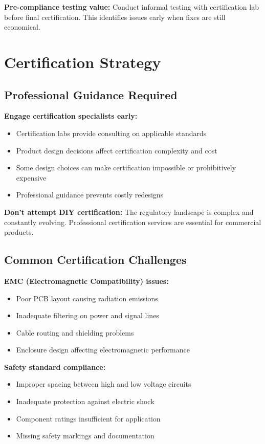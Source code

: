 \textbf{Pre-compliance testing value:}
Conduct informal testing with certification lab before final certification. This identifies issues early when fixes are still economical.

\section{Certification Strategy}

\subsection{Professional Guidance Required}

\textbf{Engage certification specialists early:}
\begin{itemize}
\item Certification labs provide consulting on applicable standards
\item Product design decisions affect certification complexity and cost
\item Some design choices can make certification impossible or prohibitively expensive
\item Professional guidance prevents costly redesigns
\end{itemize}

\textbf{Don't attempt DIY certification:}
The regulatory landscape is complex and constantly evolving. Professional certification services are essential for commercial products.

\subsection{Common Certification Challenges}

\textbf{EMC (Electromagnetic Compatibility) issues:}
\begin{itemize}
\item Poor PCB layout causing radiation emissions
\item Inadequate filtering on power and signal lines
\item Cable routing and shielding problems
\item Enclosure design affecting electromagnetic performance
\end{itemize}

\textbf{Safety standard compliance:}
\begin{itemize}
\item Improper spacing between high and low voltage circuits
\item Inadequate protection against electric shock
\item Component ratings insufficient for application
\item Missing safety markings and documentation
\end{itemize}

